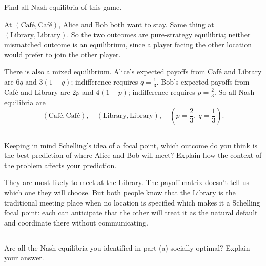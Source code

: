 \documentclass[newpages]{assignment}
\begin{document}
\subsection{}
\begin{problem}
    Find all Nash equilibria of this game.
\end{problem}

\begin{solution}
    At \((\text{Café},\text{Café})\), Alice and Bob both want to stay. Same thing at
    \((\text{Library},\text{Library})\). So the two
    outcomes are pure-strategy equilibria; neither
    mismatched outcome is an equilibrium, since a player facing the other
    location would prefer to join the other player.

    There is also a mixed equilibrium. Alice's
    expected payoffs from Café and Library are \(6q\) and \(3(1-q)\);
    indifference requires \(q=\frac13\). Bob's expected payoffs from Café
    and Library are \(2p\) and \(4(1-p)\); indifference requires
    \(p=\frac23\). So all Nash equilibria are
    \[
        (\text{Café},\text{Café}),\quad
        (\text{Library},\text{Library}),\quad
        \left(p=\frac23,\ q=\frac13\right).
    \]
\end{solution}

\subsection{}
\begin{problem}
    Keeping in mind Schelling's idea of a focal point, which outcome do you think is the best prediction of where Alice and Bob will meet? Explain how the context of the problem affects your prediction.
\end{problem}

\begin{solution}
    They are most likely to  meet at the Library. The payoff matrix
    doesn't tell us which
    one they will choose. But both people know that the Library is the
    traditional meeting place when no location is specified which makes it a Schelling focal point: each can
    anticipate that the other will treat it as the natural default and
    coordinate there without communicating.
\end{solution}

\subsection{}
\begin{problem}
    Are all the Nash equilibria you identified in part (a) socially optimal? Explain your answer.
\end{problem}
\end{document}
